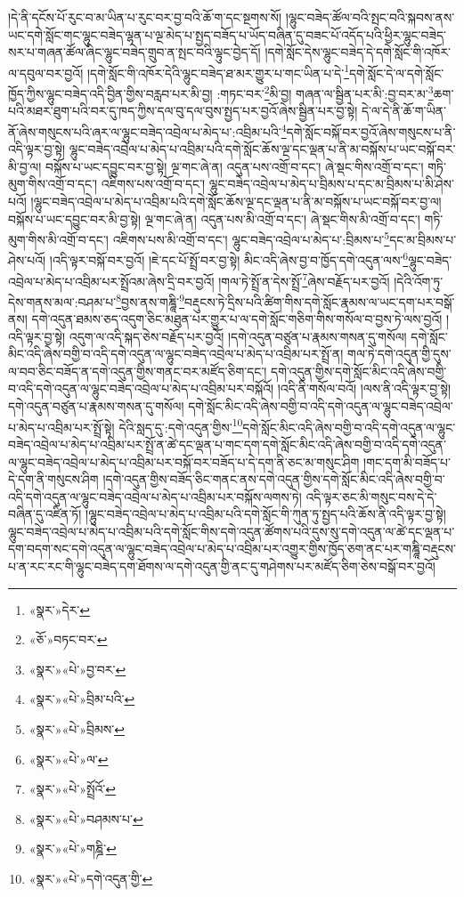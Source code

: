 །དེ་ནི་དངོས་པོ་རུང་བ་མ་ཡིན་པ་རུང་བར་བྱ་བའི་ཆོ་ག་དང་སྔགས་སོ། །ལྷུང་བཟེད་ཚོལ་བའི་སྤང་བའི་སྐབས་ནས་ཡང་དགེ་སློང་གང་ལྷུང་བཟེད་ལྷན་པ་ལྔ་མེད་པ་སྤྱད་བཟོད་པ་ཡོད་བཞིན་དུ་བཟང་པོ་འདོད་པའི་ཕྱིར་ལྷུང་བཟེད་སར་པ་གཞན་ཚོལ་ཞིང་ལྷུང་བཟེད་གྲུབ་ན་སྤང་བའི་ལྟུང་བྱེད་དོ། །དགེ་སློང་དེས་ལྷུང་བཟེད་དེ་དགེ་སློང་གི་འཁོར་ལ་དབུལ་བར་བྱའོ། །དགེ་སློང་གི་འཁོར་དེའི་ལྷུང་བཟེད་ཐ་མར་གྱུར་པ་གང་ཡིན་པ་དེ་\footnote{«སྣར་»དེར་}དགེ་སློང་དེ་ལ་དགེ་སློང་ཁྱོད་ཀྱིས་ལྷུང་བཟེད་འདི་བྱིན་གྱིས་བརླབ་པར་མི་བྱ། :གཏང་བར་\footnote{«ཅོ་»བཏང་བར་}མི་བྱ། གཞན་ལ་སྦྱིན་པར་མི་:བྱ་བར་མ་\footnote{«སྣར་»«པེ་»བྱ་བར་}ཆག་པའི་མཐར་ཐུག་པའི་བར་དུ་ཁད་ཀྱིས་དལ་བུ་དལ་བུས་སྤྱད་པར་བྱའོ་ཞེས་སྦྱིན་པར་བྱ་སྟེ། དེ་ལ་དེ་ནི་ཆོ་ག་ཡིན་ནོ་ཞེས་གསུངས་པའི་ཞར་ལ་ལྷུང་བཟེད་འབྲེལ་པ་མེད་པ་:འབྲིམ་པའི་\footnote{«སྣར་»«པེ་»བྲིམ་པའི་}དགེ་སློང་བསྐོ་བར་བྱའོ་ཞེས་གསུངས་པ་ནི་འདི་ལྟར་བྱ་སྟེ། ལྷུང་བཟེད་འབྲེལ་པ་མེད་པ་འབྲིམ་པའི་དགེ་སློང་ཆོས་ལྔ་དང་ལྡན་པ་ནི་མ་བསྐོས་པ་ཡང་བསྐོ་བར་མི་བྱ་ལ། བསྐོས་པ་ཡང་དབྱུང་བར་བྱ་སྟེ། ལྔ་གང་ཞེ་ན། འདུན་པས་འགྲོ་བ་དང་། ཞེ་སྡང་གིས་འགྲོ་བ་དང་། གཏི་མུག་གིས་འགྲོ་བ་དང་། འཇིགས་པས་འགྲོ་བ་དང་། ལྷུང་བཟེད་འབྲེལ་པ་མེད་པ་བྲིམས་པ་དང་མ་བྲིམས་པ་མི་ཤེས་པའོ། །ལྷུང་བཟེད་འབྲེལ་པ་མེད་པ་འབྲིམ་པའི་དགེ་སློང་ཆོས་ལྔ་དང་ལྡན་པ་ནི་མ་བསྐོས་པ་ཡང་བསྐོ་བར་བྱ་ལ། བསྐོས་པ་ཡང་དབྱུང་བར་མི་བྱ་སྟེ། ལྔ་གང་ཞེ་ན། འདུན་པས་མི་འགྲོ་བ་དང་། ཞེ་སྡང་གིས་མི་འགྲོ་བ་དང་། གཏི་མུག་གིས་མི་འགྲོ་བ་དང་། འཇིགས་པས་མི་འགྲོ་བ་དང་། ལྷུང་བཟེད་འབྲེལ་པ་མེད་པ་:བྲིམས་པ་\footnote{«སྣར་»«པེ་»བྲིམས་}དང་མ་བྲིམས་པ་ཤེས་པའོ། །འདི་ལྟར་བསྐོ་བར་བྱའོ། །ཇེ་དང་པོ་སྤྲོ་བར་བྱ་སྟེ། མིང་འདི་ཞེས་བྱ་བ་ཁྱོད་དགེ་འདུན་ལས་\footnote{«སྣར་»«པེ་»ལ་}ལྷུང་བཟེད་འབྲེལ་པ་མེད་པ་འབྲིམ་པར་སྤྲོའམ་ཞེས་དྲི་བར་བྱའོ། །གལ་ཏེ་སྤྲོ་ན་དེས་སྤྲོ་\footnote{«སྣར་»«པེ་»སྤྲོའོ་}ཞེས་བརྗོད་པར་བྱའོ། །དེའི་འོག་ཏུ་དེས་གནས་མལ་:བཤམ་པ་\footnote{«སྣར་»«པེ་»བཤམས་པ་}བྱས་ནས་གཎྜཱི་\footnote{«སྣར་»«པེ་»གཎྜི་}བརྡུངས་ཏེ་དྲིས་པའི་ཚིག་གིས་དགེ་སློང་རྣམས་ལ་ཡང་དག་པར་བསྒོ་ནས། དགེ་འདུན་ཐམས་ཅད་འདུག་ཅིང་མཐུན་པར་གྱུར་པ་ལ་དགེ་སློང་གཅིག་གིས་གསོལ་བ་བྱས་ཏེ་ལས་བྱའོ། །འདི་ལྟར་བྱ་སྟེ། འདུག་ལ་འདི་སྐད་ཅེས་བརྗོད་པར་བྱའོ། །དགེ་འདུན་བཙུན་པ་རྣམས་གསན་དུ་གསོལ། དགེ་སློང་མིང་འདི་ཞེས་བགྱི་བ་འདི་དགེ་འདུན་ལ་ལྷུང་བཟེད་འབྲེལ་པ་མེད་པ་འབྲིམ་པར་སྤྲོ་ན། གལ་ཏེ་དགེ་འདུན་གྱི་དུས་ལ་བབ་ཅིང་བཟོད་ན་དགེ་འདུན་གྱིས་གནང་བར་མཛོད་ཅིག་དང་། དགེ་འདུན་གྱིས་དགེ་སློང་མིང་འདི་ཞེས་བགྱི་བ་འདི་དགེ་འདུན་ལ་ལྷུང་བཟེད་འབྲེལ་པ་མེད་པ་འབྲིམ་པར་བསྐོའོ། །འདི་ནི་གསོལ་བའོ། །ལས་ནི་འདི་ལྟར་བྱ་སྟེ། དགེ་འདུན་བཙུན་པ་རྣམས་གསན་དུ་གསོལ། དགེ་སློང་མིང་འདི་ཞེས་བགྱི་བ་འདི་དགེ་འདུན་ལ་ལྷུང་བཟེད་འབྲེལ་པ་མེད་པ་འབྲིམ་པར་སྤྲོ་སྟེ། དེའི་སླད་དུ་:དགེ་འདུན་གྱིས་\footnote{«སྣར་»«པེ་»དགེ་འདུན་གྱི་}དགེ་སློང་མིང་འདི་ཞེས་བགྱི་བ་འདི་དགེ་འདུན་ལ་ལྷུང་བཟེད་འབྲེལ་པ་མེད་པ་འབྲིམ་པར་སྤྲོ་ན་ཚེ་དང་ལྡན་པ་གང་དག་དགེ་སློང་མིང་འདི་ཞེས་བགྱི་བ་འདི་དགེ་འདུན་ལ་ལྷུང་བཟེད་འབྲེལ་པ་མེད་པ་འབྲིམ་པར་བསྐོ་བར་བཟོད་པ་དེ་དག་ནི་ཅང་མ་གསུང་ཤིག །གང་དག་མི་བཟོད་པ་དེ་དག་ནི་གསུངས་ཤིག །དགེ་འདུན་གྱིས་བཟོད་ཅིང་གནང་ནས་དགེ་འདུན་གྱིས་དགེ་སློང་མིང་འདི་ཞེས་བགྱི་བ་འདི་དགེ་འདུན་ལ་ལྷུང་བཟེད་འབྲེལ་པ་མེད་པ་འབྲིམ་པར་བསྐོས་ལགས་ཏེ། འདི་ལྟར་ཅང་མི་གསུང་བས་དེ་དེ་བཞིན་དུ་འཛིན་ཏོ། །ལྷུང་བཟེད་འབྲེལ་པ་མེད་པ་འབྲིམ་པའི་དགེ་སློང་གི་ཀུན་ཏུ་སྤྱད་པའི་ཆོས་ནི་འདི་ལྟར་བྱ་སྟེ། ལྷུང་བཟེད་འབྲེལ་པ་མེད་པ་འབྲིམ་པའི་དགེ་སློང་གིས་དགེ་འདུན་ཚོགས་པའི་དུས་སུ་དགེ་འདུན་ལ་ཚེ་དང་ལྡན་པ་དག་བདག་སང་དགེ་འདུན་ལ་ལྷུང་བཟེད་འབྲེལ་པ་མེད་པ་འབྲིམ་པར་འགྱུར་གྱིས་ཁྱོད་ཅག་ནང་པར་གཎྜཱི་བརྡུངས་པ་ན་རང་རང་གི་ལྷུང་བཟེད་དག་ཐོགས་ལ་དགེ་འདུན་གྱི་ནང་དུ་གཤེགས་པར་མཛོད་ཅིག་ཅེས་བསྒོ་བར་བྱའོ། 